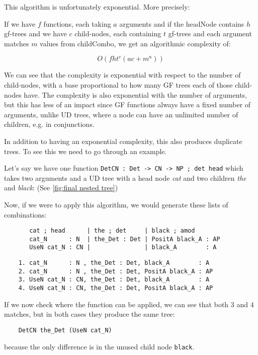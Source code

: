 This algorithm is unfortunately exponential. More precisely:

If we have $f$ functions, each taking $a$ arguments and
if the headNode contains $h$ gf-trees
and we have $c$ child-nodes, each containing $t$ gf-trees
and each argument matches $m$ values from childCombo, we get an algorithmic complexity of:


$$
O(f h t^c (ac+m^a))
$$

We can see that the complexity is exponential with respect to the number of child-nodes, with a base proportional to how many GF trees each of those child-nodes have. The complexity is also exponential with the number of arguments, but this has less of an impact since GF functions always have a fixed number of arguments, unlike UD trees, where a node can have an unlimited number of children, e.g. in conjunctions.


In addition to having an exponential complexity, this also produces duplicate trees. To see this we need to go through an example.

Let's say we have one function \verb|DetCN : Det -> CN -> NP ; det head| which takes two arguments and a UD tree with a head node \emph{cat} and two children \emph{the} and \emph{black}: (See \autoref{fig:final nested tree})

Now, if we were to apply this algorithm, we would generate these lists of combinations:
\begin{verbatim}
       cat ; head      | the ; det     | black ; amod
       cat_N      : N  | the_Det : Det | PositA black_A : AP
       UseN cat_N : CN |               | black_A        : A
\end{verbatim}

\begin{verbatim}
    1. cat_N      : N , the_Det : Det, black_A        : A
    2. cat_N      : N , the_Det : Det, PositA black_A : AP
    3. UseN cat_N : CN, the_Det : Det, black_A        : A
    4. UseN cat_N : CN, the_Det : Det, PositA black_A : AP
\end{verbatim}

If we now check where the function can be applied, we can see that both 3 and 4 matches,
but in both cases they produce the same tree:
\begin{verbatim}
    DetCN the_Det (UseN cat_N)
\end{verbatim}
because the only difference is in the unused child node \verb|black|.

